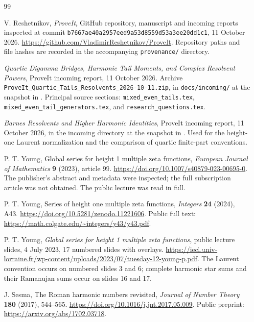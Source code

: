 \documentclass[11pt,a4paper]{article}
\numberwithin{equation}{section}
\theoremstyle{definition}
\begin{document}
\begin{thebibliography}{99}
\raggedright

V. Reshetnikov, \emph{ProveIt}, GitHub repository, manuscript and
incoming reports inspected at commit
\texttt{b7667ae40a2957eed9a53d8559d53a3ee20dd1c1},
11 October 2026.
\url{https://github.com/VladimirReshetnikov/ProveIt}.
Repository paths and file hashes are recorded in the accompanying
\texttt{provenance/} directory.

\emph{Quartic Digamma Bridges, Harmonic Tail Moments, and Complex Resolvent Powers}, ProveIt incoming report,
11 October 2026. Archive
\texttt{ProveIt\_Quartic\_Tails\_Resolvents\_2026-10-11.zip},
in \texttt{docs/incoming/} at the snapshot in \cite{Repo}.
Principal source sections: \texttt{mixed\_even\_tails.tex},
\texttt{mixed\_even\_tail\_generators.tex}, and
\texttt{research\_questions.tex}.

\emph{Barnes Resolvents and Higher Harmonic Identities}, ProveIt incoming
report, 11 October 2026, in the incoming directory at the snapshot
in \cite{Repo}. Used for the height-one Laurent normalization and
the comparison of quartic finite-part conventions.

P. T. Young, Global series for height 1 multiple zeta functions,
\emph{European Journal of Mathematics} \textbf{9} (2023), article 99.
\url{https://doi.org/10.1007/s40879-023-00695-0}.
The publisher's abstract and metadata were inspected; the full
subscription article was not obtained. The public lecture
\cite{YoungLecture} was read in full.

P. T. Young, Series of height one multiple zeta functions,
\emph{Integers} \textbf{24} (2024), A43.
\url{https://doi.org/10.5281/zenodo.11221606}.
Public full text: \url{https://math.colgate.edu/~integers/y43/y43.pdf}.

P. T. Young, \emph{Global series for height 1 multiple zeta functions},
public lecture slides, 4 July 2023, 17 numbered slides with overlays.
\url{https://iecl.univ-lorraine.fr/wp-content/uploads/2023/07/tuesday-12-young-p.pdf}.
The Laurent convention occurs on numbered slides 3 and 6; complete
harmonic star sums and their Ramanujan sums occur on slides 16 and 17.

J. Sesma, The Roman harmonic numbers revisited,
\emph{Journal of Number Theory} \textbf{180} (2017), 544--565.
\url{https://doi.org/10.1016/j.jnt.2017.05.009}.
Public preprint: \url{https://arxiv.org/abs/1702.03718}.


\end{thebibliography}
\end{document}
